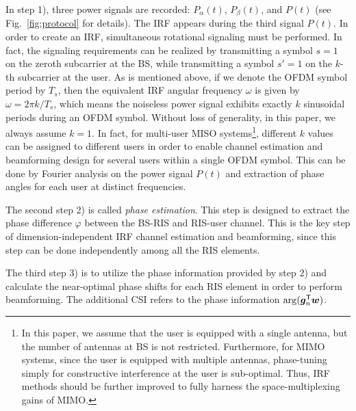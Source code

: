 \documentclass[journal,twocolumn]{IEEEtran}
\theoremstyle{nonumberplain}
\def \T {\bm \Theta}
\def \T {^{\mathsf{T}}}
\begin{document}
    In step 1), three power signals are recorded: $P_{\alpha}(t)$, $P_{\beta}(t)$, and $P(t)$ (see Fig.~\ref{fig:protocol} for details). The IRF appears during the third signal $P(t)$. 
    In order to create an IRF, simultaneous rotational signaling must be performed. 
    In fact, the signaling requirements can be realized by transmitting a symbol $s=1$ on the zeroth subcarrier at the BS, while transmitting a symbol $s'=1$ on the $k$-th subcarrier at the user. 
    As is mentioned above, if we denote the OFDM symbol period by $T_s$, then the equivalent IRF angular frequency $\omega$ is given by $\omega = 2\pi k /T_s$, which means the noiseless power signal exhibits exactly $k$ sinusoidal periods during an OFDM symbol. 
    Without loss of generality, in this paper, we always assume $k=1$. 
    In fact, for multi-user MISO systems\footnote{In this paper, we assume that the user is equipped with a single antenna, but the number of antennas at BS is not restricted. Furthermore, for MIMO systems, since the user is equipped with multiple antennas, phase-tuning simply for constructive interference at the user is sub-optimal. Thus, IRF methods should be further improved to fully harness the space-multiplexing gains of MIMO.}, different $k$ values can be assigned to different users in order to enable channel estimation and beamforming design for several users within a single OFDM symbol. 
    This can be done by Fourier analysis on the power signal $P(t)$ and extraction of phase angles for each user at distinct frequencies. 

    The second step 2) is called {\it phase estimation}. This step is designed to extract the phase difference $\varphi$ between the BS-RIS and RIS-user channel. 
    This is the key step of dimension-independent IRF channel estimation and beamforming, since this step can be done independently among all the RIS elements. 

    The third step 3) is to utilize the phase information provided by step 2) and calculate the near-optimal phase shifts for each RIS element in order to perform beamforming. The additional CSI refers to the phase information ${\rm arg}({\bm g}_n\T {\bm w})$. 
\end{document}
